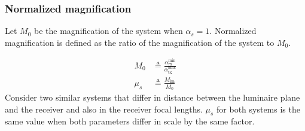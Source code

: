 \subsubsection{Normalized magnification}
\label{subsubsec:frameworkMagnification}
Let $M_0$ be the magnification of the system when $\alpha_{s}=1$. Normalized magnification is defined as the ratio of the magnification of the system to $M_0$.

\begin{align}
	M_{0} &\triangleq \frac{\alpha_{\text{rx}}^{\text{min}}}{\alpha_{\text{tx}}^{\text{max}}}\label{eqM0}\\
	\mu_{s} &\triangleq \frac{M_{\text{im}}}{M_{0}}\label{eqMS}
\end{align}
Consider two similar systems that differ in distance between the luminaire plane and the receiver and also in the receiver focal lengths. $\mu_{s}$ for both systems is the same value when both parameters differ in scale by the same factor.